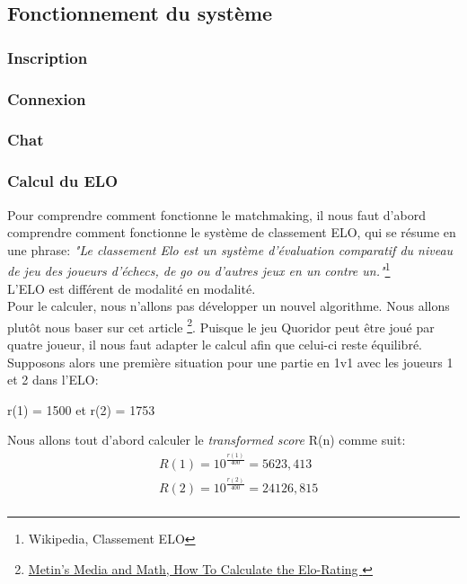 \subsection{Fonctionnement du système}
        \subsubsection{Inscription}
        \subsubsection{Connexion}
        \subsubsection{Chat}
        \subsubsection{Calcul du ELO}
        Pour comprendre comment fonctionne le matchmaking, il nous faut d'abord comprendre comment fonctionne le système de classement ELO, qui se résume en une phrase:
        \textit{"Le classement Elo est un système d’évaluation comparatif du niveau de jeu des joueurs d’échecs, de go ou d’autres jeux en un contre un."}\footnote{Wikipedia, Classement ELO} \\
        L'ELO est différent de modalité en modalité. \\
        Pour le calculer, nous n'allons pas développer un nouvel algorithme. Nous allons plutôt nous baser sur cet article \footnote{\href{https://metinmediamath.wordpress.com/2013/11/27/how-to-calculate-the-elo-rating-including-example/}{Metin's Media and Math, How To Calculate the Elo-Rating }}.
        Puisque le jeu Quoridor peut être joué par quatre joueur, il nous faut adapter le calcul afin que celui-ci reste équilibré. \\
        Supposons alors une première situation pour une partie en 1v1 avec les joueurs 1 et 2 dans l'ELO:
    \begin{center}
        r(1) = 1500 et r(2) = 1753
    \end{center}
    Nous allons tout d'abord calculer le \textit{transformed score} R(n) comme suit:
    \begin{equation}
        \begin{split}
            & R(1) = 10^{\frac{r(1)}{400}} = 5623,413 \\
            & R(2) = 10^{\frac{r(2)}{400}} = 24126,815 \\
        \end{split}
    \end{equation}

